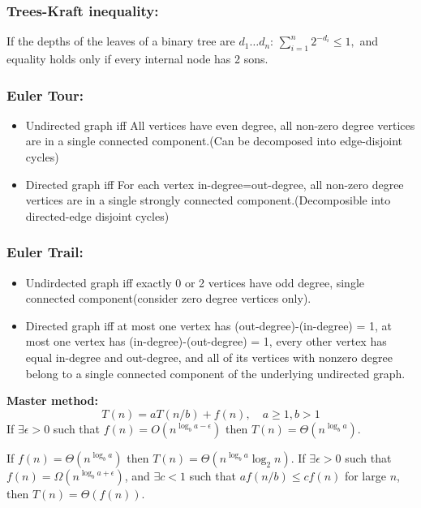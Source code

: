 \documentclass[12pt]{extarticle}
\begin{document}
\begin{multicols*}{2}
			\subsubsection*{Trees-Kraft inequality:}
			If the depths of the leaves of a binary tree are $d_1 \ldots d_n$:
			$
			\sum_{i=1}^n 2^{- d_i} \leq 1,
			$
			and equality holds only if every internal node has 2 sons.
			\par\vskip 2pt
			\subsubsection*{Euler Tour:}
			\begin{itemize}
			\itemsep0em
			\item Undirected graph iff All vertices have even degree, all non-zero degree vertices are in a single connected component.(Can be decomposed into edge-disjoint cycles)
			\item Directed graph iff For each vertex in-degree=out-degree, all non-zero degree vertices are in a single strongly connected component.(Decomposible into directed-edge disjoint cycles)
			\end{itemize}
			\subsubsection*{Euler Trail:}
			\begin{itemize}
			\itemsep0em 
			\item Undirdected graph iff exactly 0 or 2 vertices have odd degree, single connected component(consider zero degree vertices only).
			\item Directed graph iff at most one vertex has (out-degree)-(in-degree) = 1, at most one vertex has (in-degree)-(out-degree) = 1, every other vertex has equal in-degree and out-degree, and all of its vertices with nonzero degree belong to a single connected component of the underlying undirected graph.
			\end{itemize}

			\par\vskip 3pt
			\textbf{Master method:}
				$$T(n) = aT(n/b) + f(n), \quad a\geq 1, b > 1$$
			If $\exists \epsilon > 0$ such that $f(n) = O(n^{\log_b a - \epsilon})$ then $T(n) = \Theta(n^{\log_b a}).$
			\par
			If $f(n) = \Theta(n^{\log_b a})$ then
			$T(n) = \Theta(n^{\log_b a} \log_2 n).$
			\newline If $\exists \epsilon > 0$ such that $f(n) = \Omega(n^{\log_b a + \epsilon})$,
			and $\exists c < 1$ such that $a f(n/b) \leq cf(n)$ for large $n$,
			then $T(n) = \Theta(f(n)).$
			\par\vskip 3pt

\end{multicols*}
\end{document}
